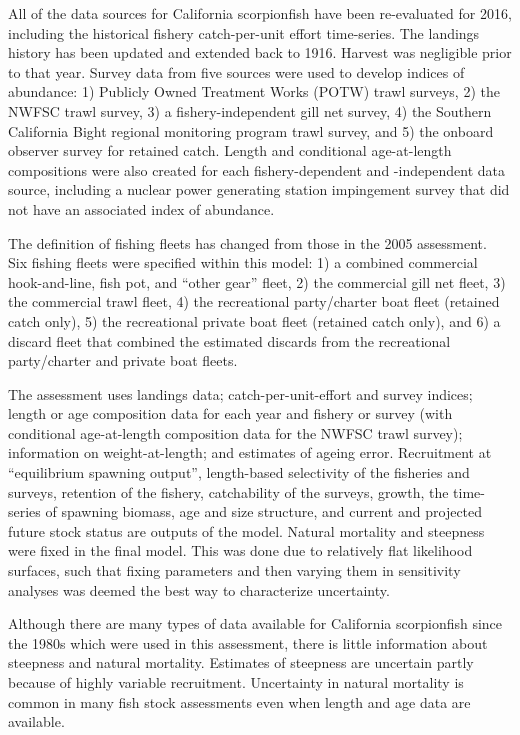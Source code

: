 \documentclass[12pt,]{article}
\begin{document}
All of the data sources for California scorpionfish have been
re-evaluated for 2016, including the historical fishery catch-per-unit
effort time-series. The landings history has been updated and extended
back to 1916. Harvest was negligible prior to that year. Survey data
from five sources were used to develop indices of abundance: 1) Publicly
Owned Treatment Works (POTW) trawl surveys, 2) the NWFSC trawl survey,
3) a fishery-independent gill net survey, 4) the Southern California
Bight regional monitoring program trawl survey, and 5) the onboard
observer survey for retained catch. Length and conditional age-at-length
compositions were also created for each fishery-dependent and
-independent data source, including a nuclear power generating station
impingement survey that did not have an associated index of abundance.

The definition of fishing fleets has changed from those in the 2005
assessment.\\
Six fishing fleets were specified within this model: 1) a combined
commercial hook-and-line, fish pot, and ``other gear'' fleet, 2) the
commercial gill net fleet, 3) the commercial trawl fleet, 4) the
recreational party/charter boat fleet (retained catch only), 5) the
recreational private boat fleet (retained catch only), and 6) a discard
fleet that combined the estimated discards from the recreational
party/charter and private boat fleets.

The assessment uses landings data; catch-per-unit-effort and survey
indices; length or age composition data for each year and fishery or
survey (with conditional age-at-length composition data for the NWFSC
trawl survey); information on weight-at-length; and estimates of ageing
error. Recruitment at ``equilibrium spawning output'', length-based
selectivity of the fisheries and surveys, retention of the fishery,
catchability of the surveys, growth, the time-series of spawning
biomass, age and size structure, and current and projected future stock
status are outputs of the model. Natural mortality and steepness were
fixed in the final model. This was done due to relatively flat
likelihood surfaces, such that fixing parameters and then varying them
in sensitivity analyses was deemed the best way to characterize
uncertainty.

Although there are many types of data available for California
scorpionfish since the 1980s which were used in this assessment, there
is little information about steepness and natural mortality. Estimates
of steepness are uncertain partly because of highly variable
recruitment. Uncertainty in natural mortality is common in many fish
stock assessments even when length and age data are available.
\end{document}
